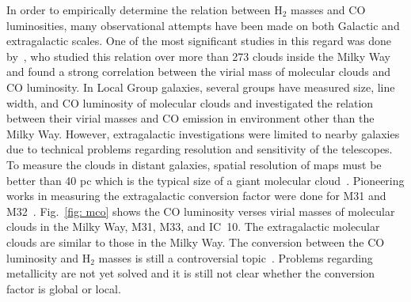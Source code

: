 In order to empirically determine the relation between H$_2$ masses and CO luminosities, many observational attempts have been made on both Galactic and extragalactic scales. 
One of the most significant studies in this regard was done by~\cite{Solomon87}, who studied this relation over more than 273 clouds inside the Milky Way and found a strong correlation between the virial mass of molecular clouds and CO luminosity. 
In Local Group galaxies, several groups have measured size, line width, and CO luminosity of molecular clouds and investigated the relation between  their virial masses and CO emission in environment other than the Milky Way. However, extragalactic investigations were limited to nearby galaxies due to technical problems regarding resolution and sensitivity of the telescopes. 
To measure the clouds in distant galaxies, spatial resolution of maps must be better than 40 pc which is the typical size of a giant molecular cloud~\citep[e.g.][and refrences therein]{Bolato13}. %
Pioneering works in measuring the extragalactic conversion factor were done for M31 and M32~\citep[e.g.,][]{Wilson89, Wilson90}. 
Fig.~\ref{fig: mco} shows the CO luminosity verses virial masses of molecular clouds in the Milky Way, M31, M33, and IC~10. 
The extragalactic molecular clouds are similar to those in the Milky Way. 
The conversion between the CO luminosity and H$_2$ masses is still a controversial topic~\citep[e.g.][]{Narayanan11, Bolato13, Sandstrom13}.
Problems regarding metallicity are not yet solved and it is still not clear whether the conversion factor is global or local. 

